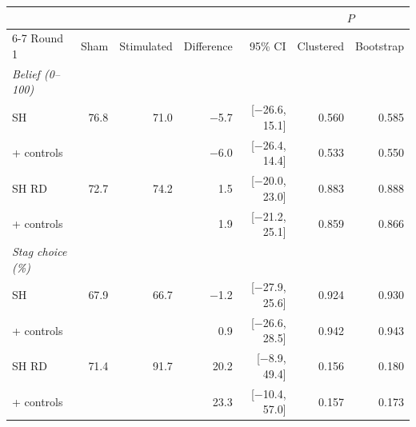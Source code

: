 \small
\begin{tabular}{lrrrrrr}
\toprule
& & & & & \multicolumn{2}{c}{$P$} \\
\cmidrule(lr){6-7}
Round 1 & Sham & Stimulated & Difference & 95\% CI & Clustered & Bootstrap \\
\midrule
\textit{Belief (0--100)} &  &  &  &  &  &  \\
\quad SH & 76.8 & 71.0 & $-$5.7 & [$-$26.6, 15.1] & 0.560 & 0.585 \\
\quad\quad + controls &  &  & $-$6.0 & [$-$26.4, 14.4] & 0.533 & 0.550 \\
\quad SH RD & 72.7 & 74.2 & 1.5 & [$-$20.0, 23.0] & 0.883 & 0.888 \\
\quad\quad + controls &  &  & 1.9 & [$-$21.2, 25.1] & 0.859 & 0.866 \\
\textit{Stag choice (\%)} &  &  &  &  &  &  \\
\quad SH & 67.9 & 66.7 & $-$1.2 & [$-$27.9, 25.6] & 0.924 & 0.930 \\
\quad\quad + controls &  &  & 0.9 & [$-$26.6, 28.5] & 0.942 & 0.943 \\
\quad SH RD & 71.4 & 91.7 & 20.2 & [$-$8.9, 49.4] & 0.156 & 0.180 \\
\quad\quad + controls &  &  & 23.3 & [$-$10.4, 57.0] & 0.157 & 0.173 \\
\bottomrule
\end{tabular}
